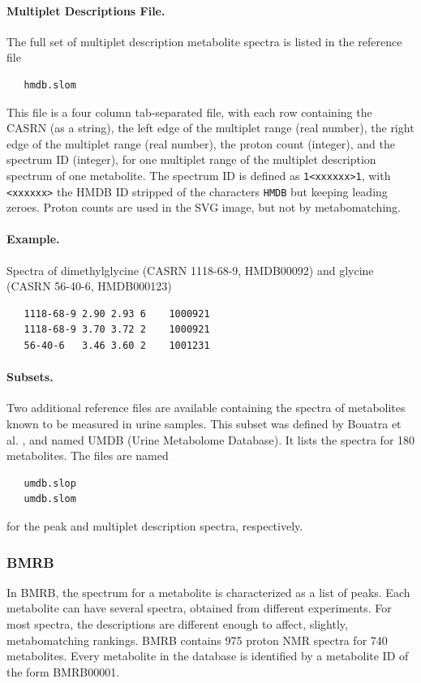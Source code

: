 \documentclass[a4paper,11pt]{article}
\begin{document}
\paragraph{Multiplet Descriptions File.} The full set of multiplet description metabolite spectra is listed in the reference file
\begin{verbatim}
   hmdb.slom
\end{verbatim}
This file is a four column tab-separated file, with each row containing the CASRN (as a string), the left edge of the multiplet range (real number),  the right edge of the multiplet range (real number), the proton count (integer), and the spectrum ID (integer), for one multiplet range of the multiplet description spectrum of one metabolite. The spectrum ID is defined as \verb|1<xxxxxx>1|, with \verb|<xxxxxx>| the HMDB ID stripped of the characters \verb|HMDB| but keeping leading zeroes. Proton counts are used in the SVG image, but not by metabomatching.
\paragraph{Example.} Spectra of dimethylglycine (CASRN 1118-68-9, HMDB00092) and glycine (CASRN 56-40-6, HMDB000123)
\begin{verbatim}
   1118-68-9 2.90 2.93 6    1000921
   1118-68-9 3.70 3.72 2    1000921
   56-40-6   3.46 3.60 2    1001231
\end{verbatim}
\paragraph{Subsets.} Two additional reference files are available containing the spectra of metabolites known to be measured in urine samples. This subset was defined by Bouatra et al. \cite{}, and named UMDB (Urine Metabolome Database). It lists the spectra for 180 metabolites. The files are named
\begin{verbatim}
   umdb.slop
   umdb.slom
\end{verbatim}
for the peak and multiplet description spectra, respectively.
\subsubsection{BMRB}
In BMRB, the spectrum for a metabolite is characterized as a list of peaks. Each metabolite can have several spectra, obtained from different experiments. For most spectra, the descriptions are different enough to affect, slightly, metabomatching rankings. BMRB contains 975 proton NMR spectra for 740 metabolites. Every metabolite in the database is identified by a metabolite ID of the form BMRB00001.
\end{document}
